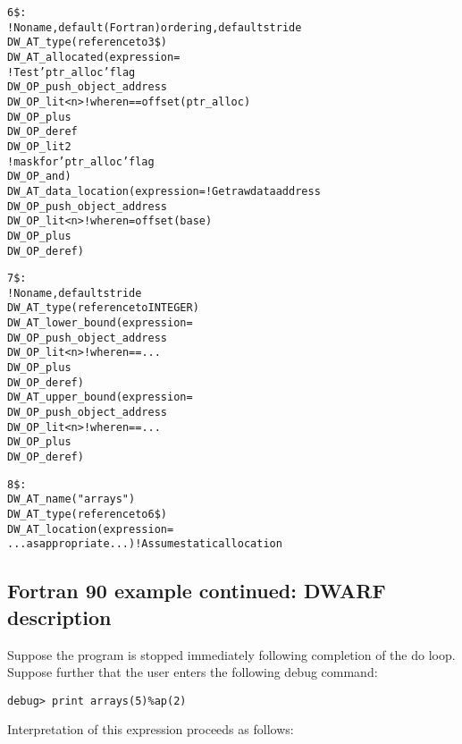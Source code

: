 \begin{alltt}
6\$: 
        ! No name, default (Fortran) ordering, default stride
        DW\_AT\_type(reference to 3\$)
        DW\_AT\_allocated(expression=
             ! Test 'ptr\_alloc' flag
            DW\_OP\_push\_object\_address
            DW\_OP\_lit<n> ! where n == offset(ptr\_alloc)
            DW\_OP\_plus
            DW\_OP\_deref
            DW\_OP\_lit2
             ! mask for 'ptr\_alloc' flag
            DW\_OP\_and)
        DW\_AT\_data\_location(expression= ! Get raw data address
            DW\_OP\_push\_object\_address
            DW\_OP\_lit<n> ! where n = offset(base)
            DW\_OP\_plus
            DW\_OP\_deref)

7\$: 
        ! No name, default stride
        DW\_AT\_type(reference to INTEGER)
        DW\_AT\_lower\_bound(expression=
            DW\_OP\_push\_object\_address
            DW\_OP\_lit<n> ! where n == ...
            DW\_OP\_plus
            DW\_OP\_deref)
        DW\_AT\_upper\_bound(expression=
            DW\_OP\_push\_object\_address
            DW\_OP\_lit<n> ! where n == ...
            DW\_OP\_plus
            DW\_OP\_deref)

8\$: 
        DW\_AT\_name("arrays")
        DW\_AT\_type(reference to 6\$)
        DW\_AT\_location(expression=
            ...as appropriate...) ! Assume static allocation
\end{alltt}

\subsection{Fortran 90 example continued: DWARF description}
\label{app:fortran90examplecontinueddwarfdescription}

Suppose the program is stopped immediately following completion
of the do loop. Suppose further that the user enters the
following debug command:

\begin{lstlisting}
debug> print arrays(5)%ap(2)
\end{lstlisting}

Interpretation of this expression proceeds as follows:

